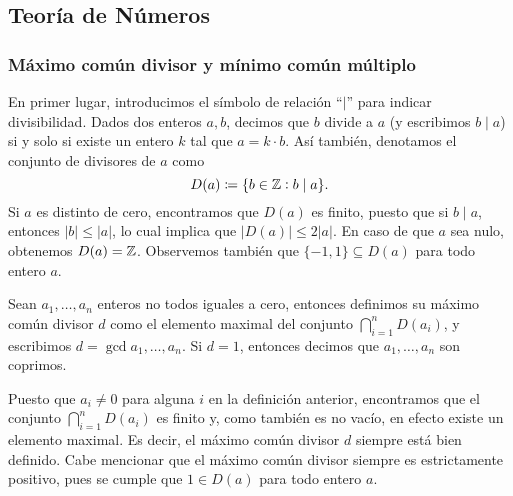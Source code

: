 \subsection{Teoría de Números}
\label{section:number-theory}
\subsubsection{Máximo común divisor y mínimo común múltiplo}
\noindent
En primer lugar, introducimos el símbolo de relación ``$\mid$'' para indicar divisibilidad. Dados
dos enteros $a, b$, decimos que $b$ divide a $a$ (y escribimos $b \mid a$) si y solo si existe un
entero $k$ tal que $a = k \cdot b$. Así también, denotamos el conjunto de divisores de $a$ como
\begin{equation*}
	D(a) \coloneq \lbrace b \in \mathbb{Z} \vcentcolon b \mid a \rbrace.
\end{equation*}
Si $a$ es distinto de cero, encontramos que $D(a)$ es finito, puesto que si $b \mid a$, entonces
$|b| \leq |a|$, lo cual implica que $|D(a)| \leq 2|a|$. En caso de que $a$ sea nulo, obtenemos $D(a)
= \mathbb{Z}$. Observemos también que $\lbrace -1, 1 \rbrace \subseteq D(a)$ para todo entero $a$.

\begin{definition}
	\label{prerreq:def:gcd}
	Sean $a_1, \ldots, a_n$ enteros no todos iguales a cero, entonces definimos su máximo común
	divisor $d$ como el elemento maximal del conjunto $\bigcap_{i=1}^{n}D(a_i)$, y escribimos $d =
	\gcd{a_1, \ldots, a_n}$. Si $d = 1$, entonces decimos que $a_1, \ldots, a_n$ son coprimos.
\end{definition}

Puesto que $a_i \neq 0$ para alguna $i$ en la definición anterior, encontramos que el conjunto
$\bigcap_{i=1}^{n}D(a_i)$ es finito y, como también es no vacío, en efecto existe un elemento maximal.
Es decir, el máximo común divisor $d$ siempre está bien definido. Cabe mencionar que el máximo común
divisor siempre es estrictamente positivo, pues se cumple que $1 \in D(a)$ para todo entero $a$.

